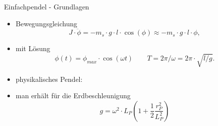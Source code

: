 \documentclass[12pt]{beamer}
\begin{document}
\begin{frame}{Einfachpendel - Grundlagen}
\begin{itemize}
	\item Bewegungsgleichung
	\begin{equation*} 
	J \cdot \ddot \phi = -m_s \cdot g \cdot l \cdot \cos(\phi)\approx -m_s \cdot g \cdot l \cdot \phi,
	\end{equation*}
	\item mit Lösung
	\begin{equation*}
	\phi(t) = \phi_{max} \cdot \cos(\omega t) \qquad T = 2\pi/\omega = 2\pi \cdot \sqrt{ l/g}.
	\end{equation*} 
	\item physikalisches Pendel:
	
	\item man erhält für die Erdbeschleunigung
	\begin{equation*}
	g = \omega^2 \cdot L_P\left(1 + \frac{1}{2} \frac{r_P^2}{L_P^2} \right)
	\end{equation*}
\end{itemize}
\end{frame}
\end{document}
